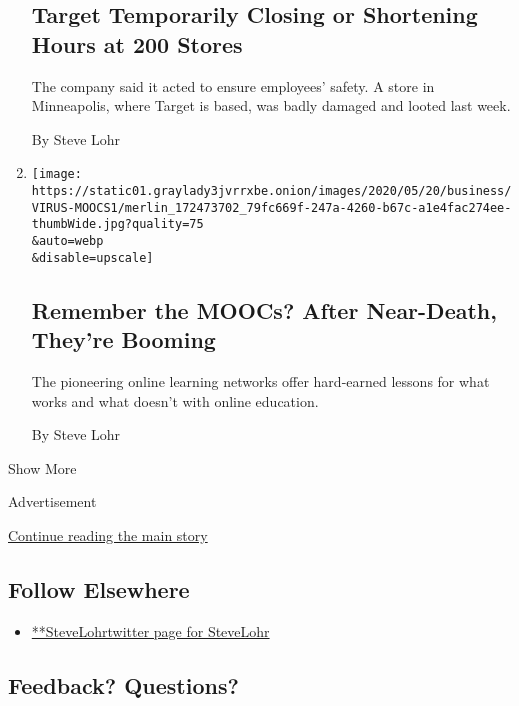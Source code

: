 \begin{enumerate}
{  \subsection{Target Temporarily Closing or Shortening Hours at 200
  Stores}\label{target-temporarily-closing-or-shortening-hours-at-200-stores}}

  The company said it acted to ensure employees' safety. A store in
  Minneapolis, where Target is based, was badly damaged and looted last
  week.

  By Steve Lohr
\item
  \href{/2020/05/26/technology/moocs-online-learning.html}{}

  \texttt{[image: https://static01.graylady3jvrrxbe.onion/images/2020/05/20/business/VIRUS-MOOCS1/merlin\_172473702\_79fc669f-247a-4260-b67c-a1e4fac274ee-thumbWide.jpg?quality=75\\\&auto=webp\\\&disable=upscale]}

  \hypertarget{remember-the-moocs-after-near-death-theyre-booming}{%
  \subsection{Remember the MOOCs? After Near-Death, They're
  Booming}\label{remember-the-moocs-after-near-death-theyre-booming}}

  The pioneering online learning networks offer hard-earned lessons for
  what works and what doesn't with online education.

  By Steve Lohr
\end{enumerate}

Show More

Advertisement

\protect\hyperlink{after-mid2}{Continue reading the main story}

\hypertarget{follow-elsewhere}{%
\subsection{Follow Elsewhere}\label{follow-elsewhere}}

\begin{itemize}
\tightlist
\item
  \href{https://twitter.com/SteveLohr}{**SteveLohrtwitter page for
  SteveLohr}
\end{itemize}

\hypertarget{feedback-questions}{%
\subsection{Feedback? Questions?}\label{feedback-questions}}

